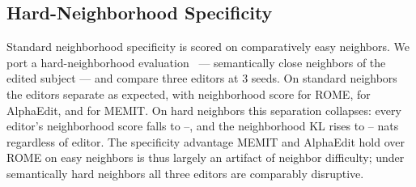 \subsection{Hard-Neighborhood Specificity}
\label{sec:generality-cfplus}
Standard neighborhood specificity is scored on comparatively easy neighbors. We
port a hard-neighborhood evaluation~\citep{hoelscher2023cfplus} ---
semantically close neighbors of the
edited subject --- and compare three editors at 3 seeds. On standard neighbors
the editors separate as expected, with neighborhood score \cfplusNSstdRome{}
for ROME, \cfplusNSmid{} for AlphaEdit, and \cfplusNSstdMemit{} for MEMIT. On
hard neighbors this separation collapses: every editor's neighborhood score
falls to \cfplusNShardLo{}--\cfplusNShardHi{}, and the neighborhood KL rises to
\cfplusKLhardLo{}--\cfplusKLhardHi{} nats regardless of editor. The specificity
advantage MEMIT and AlphaEdit hold over ROME on easy neighbors is thus largely
an artifact of neighbor difficulty; under semantically hard neighbors all three
editors are comparably disruptive.
